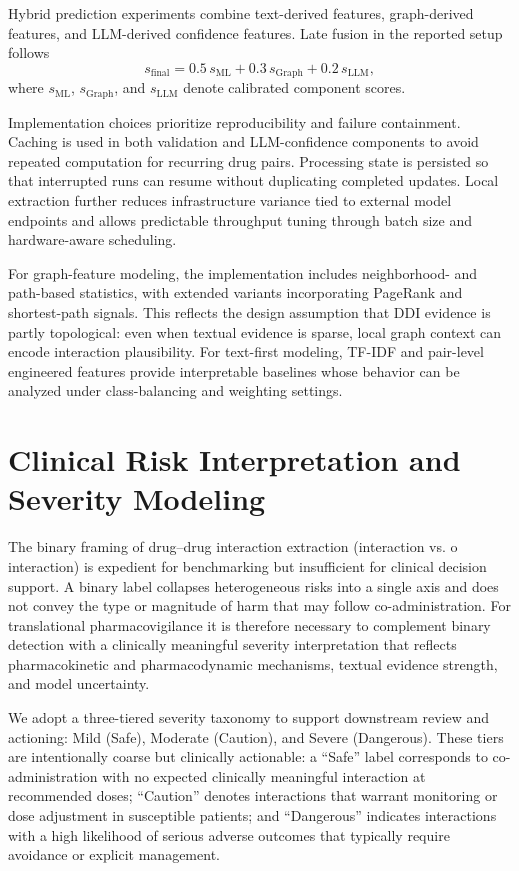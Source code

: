 \documentclass[conference]{Template/IEEEtran}
\begin{document}
Hybrid prediction experiments combine text-derived features, graph-derived features, and LLM-derived confidence features. Late fusion in the reported setup follows
\[
s_{\text{final}} = 0.5\,s_{\text{ML}} + 0.3\,s_{\text{Graph}} + 0.2\,s_{\text{LLM}},
\]
where $s_{\text{ML}}$, $s_{\text{Graph}}$, and $s_{\text{LLM}}$ denote calibrated component scores.

Implementation choices prioritize reproducibility and failure containment. Caching is used in both validation and LLM-confidence components to avoid repeated computation for recurring drug pairs. Processing state is persisted so that interrupted runs can resume without duplicating completed updates. Local extraction further reduces infrastructure variance tied to external model endpoints and allows predictable throughput tuning through batch size and hardware-aware scheduling.

For graph-feature modeling, the implementation includes neighborhood- and path-based statistics, with extended variants incorporating PageRank and shortest-path signals. This reflects the design assumption that DDI evidence is partly topological: even when textual evidence is sparse, local graph context can encode interaction plausibility. For text-first modeling, TF-IDF and pair-level engineered features provide interpretable baselines whose behavior can be analyzed under class-balancing and weighting settings.

\section{Clinical Risk Interpretation and Severity Modeling}
The binary framing of drug--drug interaction extraction (interaction vs.
o interaction) is expedient for benchmarking but insufficient for clinical decision support. A binary label collapses heterogeneous risks into a single axis and does not convey the type or magnitude of harm that may follow co-administration. For translational pharmacovigilance it is therefore necessary to complement binary detection with a clinically meaningful severity interpretation that reflects pharmacokinetic and pharmacodynamic mechanisms, textual evidence strength, and model uncertainty.

We adopt a three-tiered severity taxonomy to support downstream review and actioning: Mild (Safe), Moderate (Caution), and Severe (Dangerous). These tiers are intentionally coarse but clinically actionable: a ``Safe'' label corresponds to co-administration with no expected clinically meaningful interaction at recommended doses; ``Caution'' denotes interactions that warrant monitoring or dose adjustment in susceptible patients; and ``Dangerous'' indicates interactions with a high likelihood of serious adverse outcomes that typically require avoidance or explicit management.
\end{document}
